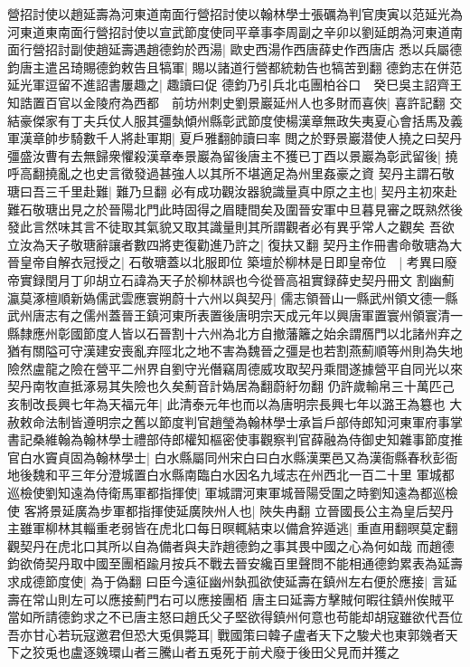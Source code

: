 營招討使以趙延壽為河東道南面行營招討使以翰林學士張礪為判官庚寅以范延光為河東道東南面行營招討使以宣武節度使同平章事李周副之辛卯以劉延朗為河東道南面行營招討副使趙延壽遇趙德鈞於西湯|{
	歐史西湯作西唐薛史作西唐店}
悉以兵屬德鈞唐主遣呂琦賜德鈞敕告且犒軍|{
	賜以諸道行營都統勅告也犒苦到翻}
德鈞志在併范延光軍逗留不進詔書屢趣之|{
	趣讀曰促}
德鈞乃引兵北屯團柏谷口　癸巳吳主詔齊王知誥置百官以金陵府為西都　前坊州刺史劉景巖延州人也多財而喜俠|{
	喜許記翻}
交結豪傑家有丁夫兵仗人服其彊埶傾州縣彰武節度使楊漢章無政失夷夏心會括馬及義軍漢章帥步騎數千人將赴軍期|{
	夏戶雅翻帥讀曰率}
閲之於野景巖潜使人撓之曰契丹彊盛汝曹有去無歸衆懼殺漢章奉景巖為留後唐主不獲已丁酉以景巖為彰武留後|{
	撓呼高翻撓亂之也史言徵發過甚強人以其所不堪適足為州里姦豪之資}
契丹主謂石敬瑭曰吾三千里赴難|{
	難乃旦翻}
必有成功觀汝器貌識量真中原之主也|{
	契丹主初來赴難石敬瑭出見之於晉陽北門此時固得之眉睫間矣及圍晉安軍中旦暮見審之既熟然後發此言然味其言不徒取其氣貌又取其識量則其所謂觀者必有異乎常人之觀矣}
吾欲立汝為天子敬瑭辭讓者數四將吏復勸進乃許之|{
	復扶又翻}
契丹主作冊書命敬瑭為大晉皇帝自解衣冠授之|{
	石敬瑭蓋以北服即位}
築壇於柳林是日即皇帝位　|{
	考異曰廢帝實録閏月丁卯胡立石諱為天子於柳林誤也今從晉高祖實録薛史契丹冊文}
割幽薊瀛莫涿檀順新媯儒武雲應寰朔蔚十六州以與契丹|{
	儒志領晉山一縣武州領文德一縣武州唐志有之儒州蓋晉王鎮河東所表置後唐明宗天成元年以興唐軍置寰州領寰清一縣隸應州彰國節度人皆以石晉割十六州為北方自撤藩籬之始余謂鴈門以北諸州弃之猶有關隘可守漢建安喪亂弃陘北之地不害為魏晉之彊是也若割燕薊順等州則為失地險然盧龍之險在營平二州界自劉守光僭竊周德威攻取契丹乘間遂據營平自同光以來契丹南牧直抵涿易其失險也久矣薊音計媯居為翻蔚紆勿翻}
仍許歲輸帛三十萬匹己亥制改長興七年為天福元年|{
	此清泰元年也而以為唐明宗長興七年以潞王為簒也}
大赦敕命法制皆遵明宗之舊以節度判官趙瑩為翰林學士承旨戶部侍郎知河東軍府事掌書記桑維翰為翰林學士禮部侍郎權知樞密使事觀察判官薛融為侍御史知雜事節度推官白水竇貞固為翰林學士|{
	白水縣屬同州宋白曰白水縣漢栗邑又為漢衙縣春秋彭衙地後魏和平三年分澄城置白水縣南臨白水因名九域志在州西北一百二十里}
軍城都巡檢使劉知遠為侍衛馬軍都指揮使|{
	軍城謂河東軍城晉陽受圍之時劉知遠為都巡檢使}
客將景延廣為步軍都指揮使延廣陜州人也|{
	陜失冉翻}
立晉國長公主為皇后契丹主雖軍柳林其輜重老弱皆在虎北口每日暝輒結束以備倉猝遁逃|{
	重直用翻暝莫定翻觀契丹在虎北口其所以自為備者與夫詐趙德鈞之事其畏中國之心為何如哉}
而趙德鈞欲倚契丹取中國至團栢踰月按兵不戰去晉安纔百里聲問不能相通德鈞累表為延壽求成德節度使|{
	為于偽翻}
曰臣今遠征幽州埶孤欲使延壽在鎮州左右便於應接|{
	言延壽在常山則左可以應接薊門右可以應接團栢}
唐主曰延壽方擊賊何暇往鎮州俟賊平當如所請德鈞求之不已唐主怒曰趙氏父子堅欲得鎮州何意也苟能却胡寇雖欲代吾位吾亦甘心若玩寇邀君但恐大兎俱斃耳|{
	戰國策曰韓子盧者天下之駿犬也東郭㕙者天下之狡兎也盧逐㕙環山者三騰山者五兎死于前犬廢于後田父見而并獲之}
